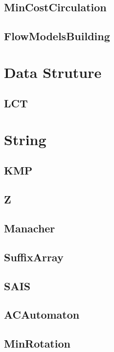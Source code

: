 	\subsection{MinCostCirculation}
	
	\subsection{FlowModelsBuilding}
	
\section{Data Struture}
	\subsection{LCT}
	
\section{String}
	\subsection{KMP}
	
	\subsection{Z}
	
	\subsection{Manacher}
	
	\subsection{SuffixArray}
	
	\subsection{SAIS}
	
	\subsection{ACAutomaton}
	
	\subsection{MinRotation}
	
